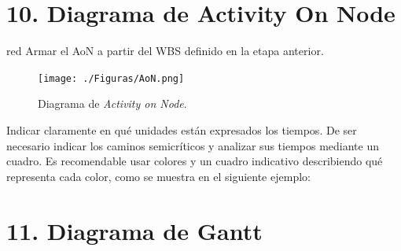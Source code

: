 \documentclass[
11pt, %
]{charter}
\begin{document}
\section{10. Diagrama de Activity On Node}
\label{sec:AoN}

\begin{consigna}{red}
Armar el AoN a partir del WBS definido en la etapa anterior. 



\end{consigna}

\begin{figure}[htpb]
\centering 
\texttt{[image: ./Figuras/AoN.png]}
\caption{Diagrama de \textit{Activity on Node}.}
\label{fig:AoN}
\end{figure}

Indicar claramente en qué unidades están expresados los tiempos.
De ser necesario indicar los caminos semicríticos y analizar sus tiempos mediante un cuadro.
Es recomendable usar colores y un cuadro indicativo describiendo qué representa cada color, como se muestra en el siguiente ejemplo:



\section{11. Diagrama de Gantt}
\label{sec:gantt}
\end{document}
